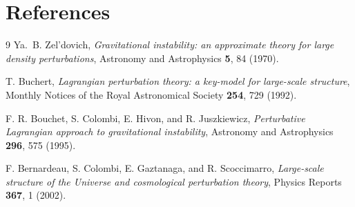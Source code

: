 \documentclass[11pt]{article}
\begin{document}
\section*{References}

\begin{thebibliography}{9}
Ya.~B. Zel'dovich,
\emph{Gravitational instability: an approximate theory for large density perturbations},
Astronomy and Astrophysics \textbf{5}, 84 (1970).

T. Buchert,
\emph{Lagrangian perturbation theory: a key-model for large-scale structure},
Monthly Notices of the Royal Astronomical Society \textbf{254}, 729 (1992).

F. R. Bouchet, S. Colombi, E. Hivon, and R. Juszkiewicz,
\emph{Perturbative Lagrangian approach to gravitational instability},
Astronomy and Astrophysics \textbf{296}, 575 (1995).

F. Bernardeau, S. Colombi, E. Gaztanaga, and R. Scoccimarro,
\emph{Large-scale structure of the Universe and cosmological perturbation theory},
Physics Reports \textbf{367}, 1 (2002).
\end{thebibliography}
\end{document}
